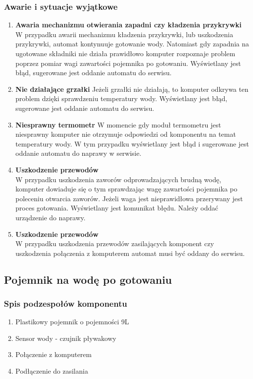 \documentclass[12pt,a4paper,notitlepage]{article}
\begin{document}
\subsubsection{Awarie i sytuacje wyjątkowe}
\begin{enumerate}
  \item \textbf{Awaria mechanizmu otwierania zapadni czy kładzenia przykrywki}
W przypadku awarii mechanizmu kładzenia przykrywki, lub uszkodzenia przykrywki, automat kontynuuje gotowanie wody. Natomiast gdy zapadnia na ugotowane składniki nie działa prawidłowo komputer rozpoznaje problem poprzez pomiar wagi zawartości pojemnika po gotowaniu. Wyświetlany jest błąd, sugerowane jest oddanie automatu do serwisu.
  \item \textbf{Nie działające grzałki}
Jeżeli grzałki nie działają, to komputer odkrywa ten problem dzięki sprawdzeniu temperatury wody. Wyświetlany jest błąd, sugerowane jest oddanie automatu do serwisu.
  \item \textbf{Niesprawny termometr}
W momencie gdy moduł termometru jest niesprawny komputer nie otrzymuje odpowiedzi od komponentu na temat temperatury wody. W tym przypadku wyświetlany jest błąd i sugerowane jest oddanie automatu do naprawy w serwisie.
  \item \textbf{Uszkodzenie przewodów}\\
W przypadku uszkodzenia zaworów odprowadzających brudną wodę, komputer dowiaduje się o tym sprawdzając wagę zawartości pojemnika po poleceniu otwarcia zaworów. Jeżeli waga jest nieprawidłowa przerywany jest proces gotowania. Wyświetlany jest komunikat błędu. Należy oddać urządzenie do naprawy.
  \item \textbf{Uszkodzenie przewodów}\\
W przypadku uszkodzenia przewodów zasilających komponent czy uszkodzenia połączenia z komputerem automat musi być oddany do serwisu.
\end{enumerate}




\subsection{Pojemnik na wodę po gotowaniu}
\subsubsection{Spis podzespołów komponentu}
\begin{enumerate}
  \item Plastikowy pojemnik o pojemności 9L
  \item Sensor wody - czujnik pływakowy
  \item Połączenie z komputerem
  \item Podłączenie do zasilania
\end{enumerate}
 
\end{document}
